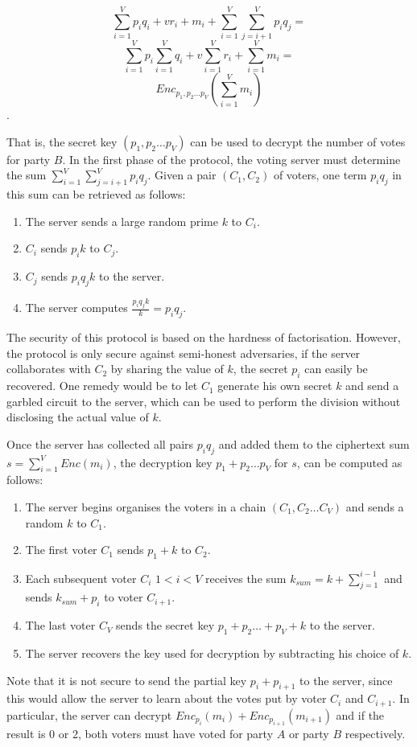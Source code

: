 \documentclass[10pt,twocolumn]{article}
\begin{document}
$$\sum_{i=1}^{V}{p_iq_i+vr_i+m_i}+\sum_{i=1}^{V}{\sum_{j=i+1}^{V}{p_iq_j}}=$$
$$\sum_{i=1}^{V}{p_i}\sum_{i=1}^{V}{q_i}+v\sum_{i=1}^{V}{r_i}+\sum_{i=1}^{V}{m_i}=$$
$$Enc_{p_1, p_2\ldots p_V}(\sum_{i=1}^{V}{m_i})$$.

That is, the secret key $(p_1, p_2\ldots p_V)$ can be used to decrypt the number of votes for party $B$. In the first phase of the protocol, the voting server must determine the sum $\sum_{i=1}^{V}{\sum_{j=i+1}^{V}{p_iq_j}}$. Given a pair $(C_1, C_2)$ of voters, one term $p_iq_j$ in this sum can be retrieved as follows:
\begin{enumerate}
    \item The server sends a large random prime $k$ to $C_i$.
    \item $C_i$ sends $p_ik$ to $C_j$.
    \item $C_j$ sends $p_iq_jk$ to the server.
    \item The server computes $\frac{p_iq_jk}{k}=p_iq_j$.
\end{enumerate}

The security of this protocol is based on the hardness of factorisation. However, the protocol is only secure against semi-honest adversaries, if the server collaborates with $C_2$ by sharing the value of $k$, the secret $p_i$ can easily be recovered. One remedy would be to let $C_1$ generate his own secret $k$ and send a garbled circuit to the server, which can be used to perform the division without disclosing the actual value of $k$.

Once the server has collected all pairs $p_iq_j$ and added them to the ciphertext sum $s=\sum_{i=1}^{V}{Enc(m_i)}$, the decryption key $p_1+p_2\ldots p_V$ for $s$, can be computed as follows:
\begin{enumerate}
    \item The server begins organises the voters in a chain $(C_1, C_2\ldots C_V)$ and sends a random $k$ to $C_1$.
    \item The first voter $C_1$ sends $p_1 + k$ to $C_2$.
    \item Each subsequent voter $C_i$ $1 < i < V$ receives the sum $k_{sum} = k + \sum_{j=1}^{i-1}$ and sends $k_{sum} + p_i$ to voter $C_{i+1}$.
    \item The last voter $C_V$ sends the secret key $p_1 + p_2\ldots + p_V + k$ to the server.
    \item The server recovers the key used for decryption by subtracting his choice of $k$.
\end{enumerate}
Note that it is not secure to send the partial key $p_i + p_{i+1}$ to the server, since this would allow the server to learn about the votes put by voter $C_i$ and $C_{i+1}$. In particular, the server can decrypt $Enc_{p_i}(m_i) + Enc_{p_{i+1}}(m_{i+1})$ and if the result is 0 or 2, both voters must have voted for party $A$ or party $B$ respectively.
\end{document}
